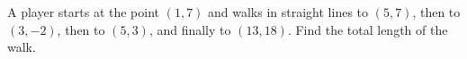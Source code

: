 A player starts at the point $(1,7)$ and walks in straight lines to $(5,7)$, then to $(3,-2)$, then to $(5,3)$, and finally to $(13,18)$. Find the total length of the walk.
